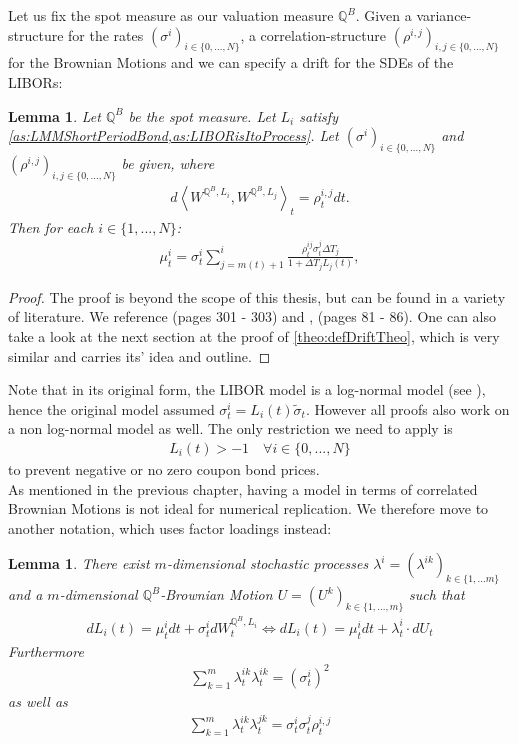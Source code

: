 \documentclass[12pt]{article}
\newtheorem{lemma}[theorem]{Lemma}
\begin{document}
	Let us fix the spot measure as our valuation measure $\mathbb{Q}^B$.
	Given a variance-structure for the rates $(\sigma^i)_{i\in\{0,...,N\}}$, a correlation-structure $(\rho^{i,j})_{i,j \in \{0,...,N\}}$ for the Brownian Motions and 
	we can specify a drift for the SDEs of the LIBORs:
	\begin{lemma}\label{lem:LMMDriftSpec}
		Let $\mathbb{Q}^B$ be the spot measure.
		Let $L_i$ satisfy \cref{as:LMMShortPeriodBond,as:LIBORisItoProcess}. Let $(\sigma^i)_{i\in\{0,...,N\}}$ and $(\rho^{i,j})_{i,j \in \{0,...,N\}}$ be given, where
		\begin{align*}
			d\left\langle W^{\mathbb{Q}^B, L_i}, W^{\mathbb{Q}^B, L_j} \right\rangle_t = \rho^{i,j}_t dt.
		\end{align*}
		Then for each $i \in \{1, ..., N\}$:
		\begin{align*}
			\mu^{i}_t = \sigma^{i}_t\sum_{j=m(t)+1}^{i}\frac{\rho^{i j}_t \sigma^{j}_t\Delta T_j}{1 + \Delta T_j L_j(t)},
		\end{align*}
	\end{lemma}
	\begin{proof}
		The proof is beyond the scope of this thesis, but can be found in a variety of literature. We reference \cite{FriesBook} (pages 301 - 303) and \cite{fima3Lecture}, (pages 81 - 86). One can also take a look at the next section at the proof of \cref{theo:defDriftTheo}, which is very similar  and carries its' idea and outline.
	\end{proof}
	Note that in its original form, the LIBOR model is a log-normal model (see \cite{FriesBook}), hence the original model assumed $\sigma^i_t = L_i(t)\tilde{\sigma}_t$. However all proofs also work on a non log-normal model as well. The only restriction we need to apply is
	\begin{align*}
		L_i(t) > -1 \quad \forall i \in \{0,...,N\}
	\end{align*}
	to prevent negative or no zero coupon bond prices.\\
	As mentioned in the previous chapter, having a model in terms of correlated Brownian Motions is not ideal for numerical replication. We therefore move to another notation, which uses factor loadings instead:
	\begin{lemma}\label{lem:LMMFactorVersion}
		There exist $m$-dimensional stochastic processes $\lambda^{i} = (\lambda^{i k})_{k \in \{1, ... m\}}$ and a $m$-dimensional $\mathbb{Q}^B$-Brownian Motion $U=(U^k)_{k \in \{1,...,m\}}$ such that
		\begin{align*}
			dL_i(t) = \mu^{i}_t dt + \sigma^{i}_t dW^{\mathbb{Q}^B, L_i}_t \iff 
			dL_i(t) = \mu^{i}_t dt + \lambda^{i}_t\cdot dU_t
		\end{align*}
		Furthermore
		\begin{align*}
			\sum_{k=1}^{m}\lambda^{i k}_t \lambda^{i k}_t = (\sigma^i_t)^2
		\end{align*}
		as well as
		\begin{align*}
			\sum_{k=1}^{m}\lambda^{i k}_t \lambda^{j k}_t = \sigma^i_t \sigma^j_t \rho^{i,j}_t
		\end{align*}
	\end{lemma}
\end{document}
